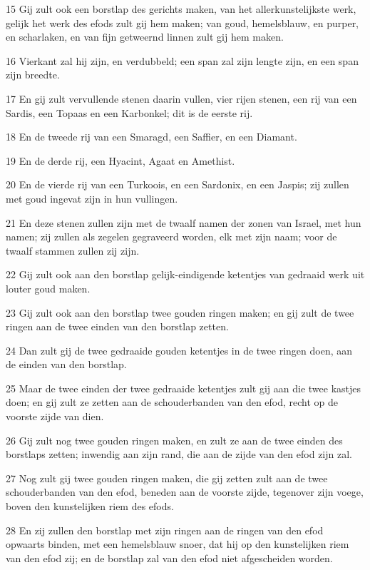 \par 15 Gij zult ook een borstlap des gerichts maken, van het allerkunstelijkste werk, gelijk het werk des efods zult gij hem maken; van goud, hemelsblauw, en purper, en scharlaken, en van fijn getweernd linnen zult gij hem maken.
\par 16 Vierkant zal hij zijn, en verdubbeld; een span zal zijn lengte zijn, en een span zijn breedte.
\par 17 En gij zult vervullende stenen daarin vullen, vier rijen stenen, een rij van een Sardis, een Topaas en een Karbonkel; dit is de eerste rij.
\par 18 En de tweede rij van een Smaragd, een Saffier, en een Diamant.
\par 19 En de derde rij, een Hyacint, Agaat en Amethist.
\par 20 En de vierde rij van een Turkoois, en een Sardonix, en een Jaspis; zij zullen met goud ingevat zijn in hun vullingen.
\par 21 En deze stenen zullen zijn met de twaalf namen der zonen van Israel, met hun namen; zij zullen als zegelen gegraveerd worden, elk met zijn naam; voor de twaalf stammen zullen zij zijn.
\par 22 Gij zult ook aan den borstlap gelijk-eindigende ketentjes van gedraaid werk uit louter goud maken.
\par 23 Gij zult ook aan den borstlap twee gouden ringen maken; en gij zult de twee ringen aan de twee einden van den borstlap zetten.
\par 24 Dan zult gij de twee gedraaide gouden ketentjes in de twee ringen doen, aan de einden van den borstlap.
\par 25 Maar de twee einden der twee gedraaide ketentjes zult gij aan die twee kastjes doen; en gij zult ze zetten aan de schouderbanden van den efod, recht op de voorste zijde van dien.
\par 26 Gij zult nog twee gouden ringen maken, en zult ze aan de twee einden des borstlaps zetten; inwendig aan zijn rand, die aan de zijde van den efod zijn zal.
\par 27 Nog zult gij twee gouden ringen maken, die gij zetten zult aan de twee schouderbanden van den efod, beneden aan de voorste zijde, tegenover zijn voege, boven den kunstelijken riem des efods.
\par 28 En zij zullen den borstlap met zijn ringen aan de ringen van den efod opwaarts binden, met een hemelsblauw snoer, dat hij op den kunstelijken riem van den efod zij; en de borstlap zal van den efod niet afgescheiden worden.
